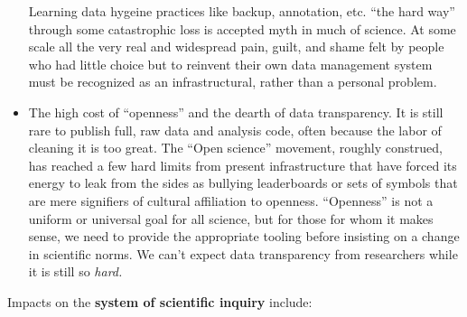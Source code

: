 \documentclass[10pt]{article}
\begin{document}
\begin{multicols}{2}
\begin{itemize}
  Learning data hygeine practices like backup, annotation, etc. ``the
  hard way'' through some catastrophic loss is accepted myth in much of
  science. At some scale all the very real and widespread pain, guilt,
  and shame felt by people who had little choice but to reinvent their
  own data management system must be recognized as an infrastructural,
  rather than a personal problem.
\item
  The high cost of ``openness'' and the dearth of data transparency. It
  is still rare to publish full, raw data and analysis code, often
  because the labor of cleaning it is too great. The ``Open science''
  movement, roughly construed, has reached a few hard limits from
  present infrastructure that have forced its energy to leak from the
  sides as bullying leaderboards or sets of symbols that are mere
  signifiers of cultural affiliation to openness. ``Openness'' is not a
  uniform or universal goal for all science, but for those for whom it
  makes sense, we need to provide the appropriate tooling before
  insisting on a change in scientific norms. We can't expect data
  transparency from researchers while it is still so \emph{hard.}
\end{itemize}

Impacts on the \textbf{system of scientific inquiry} include:

\begin{itemize}


\end{itemize}
\end{multicols}
\end{document}
